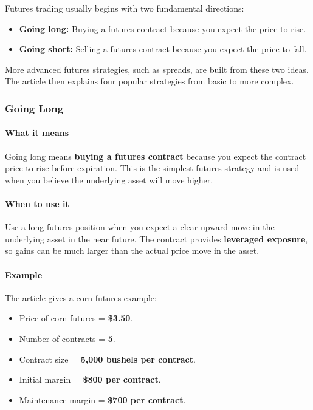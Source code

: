 \documentclass[12pt,openany]{book}
\begin{document}
Futures trading usually begins with two fundamental directions:

\begin{itemize}[leftmargin=*]
    \item \textbf{Going long:} Buying a futures contract because you expect the price to rise.
    \item \textbf{Going short:} Selling a futures contract because you expect the price to fall.
\end{itemize}

More advanced futures strategies, such as spreads, are built from these two ideas. The article then explains four popular strategies from basic to more complex.

\subsubsection{Going Long}

\paragraph{What it means}

Going long means \textbf{buying a futures contract} because you expect the contract price to rise before expiration. This is the simplest futures strategy and is used when you believe the underlying asset will move higher.

\paragraph{When to use it}

Use a long futures position when you expect a clear upward move in the underlying asset in the near future. The contract provides \textbf{leveraged exposure}, so gains can be much larger than the actual price move in the asset.

\paragraph{Example}

The article gives a corn futures example:

\begin{itemize}[leftmargin=*]
    \item Price of corn futures = \textbf{\$3.50}.
    \item Number of contracts = \textbf{5}.
    \item Contract size = \textbf{5,000 bushels per contract}.
    \item Initial margin = \textbf{\$800 per contract}.
    \item Maintenance margin = \textbf{\$700 per contract}.
\end{itemize}
\end{document}
